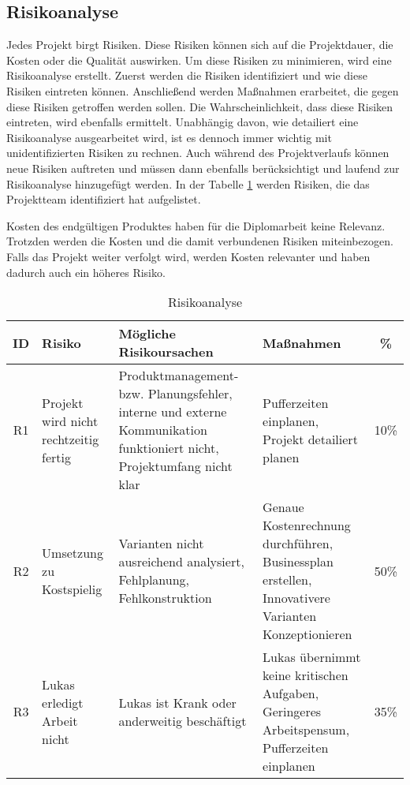 \subsection{Risikoanalyse}

Jedes Projekt birgt Risiken. Diese Risiken können sich auf die Projektdauer, die Kosten oder die Qualität auswirken. Um diese Risiken zu minimieren, wird eine Risikoanalyse erstellt. Zuerst werden die Risiken identifiziert und wie diese Risiken eintreten können. Anschließend werden Maßnahmen erarbeitet, die gegen diese Risiken getroffen werden sollen. Die Wahrscheinlichkeit, dass diese Risiken eintreten, wird ebenfalls ermittelt. Unabhängig davon, wie detailiert eine Risikoanalyse ausgearbeitet wird, ist es dennoch immer wichtig mit unidentifizierten Risiken zu rechnen. Auch während des Projektverlaufs können neue Risiken auftreten und müssen dann ebenfalls berücksichtigt und laufend zur Risikoanalyse hinzugefügt werden\cite{risikomanagement}. In der Tabelle \ref{tab:risikoanalyse} werden Risiken, die das Projektteam identifiziert hat aufgelistet.

Kosten des endgültigen Produktes haben für die Diplomarbeit keine Relevanz. Trotzden werden die Kosten und die damit verbundenen Risiken miteinbezogen. Falls das Projekt weiter verfolgt wird, werden Kosten relevanter und haben dadurch auch ein höheres Risiko.

\begin{table}[ht]
  {
    \small
    \begin{tabular}{|c|p{}|p{}|p{}|c|}
      \hline
      ID & Risiko                                & Mögliche Risikoursachen                                                                                                & Maßnahmen                                                                                         & \%   \\ \hline
      R1 & Projekt wird nicht rechtzeitig fertig & Produktmanagement- bzw. Planungsfehler, interne und externe Kommunikation funktioniert nicht, Projektumfang nicht klar & Pufferzeiten einplanen, Projekt detailiert planen                                                 & 10\% \\ \hline
      R2 & Umsetzung zu Kostspielig              & Varianten nicht ausreichend analysiert, Fehlplanung, Fehlkonstruktion                                                  & Genaue Kostenrechnung durchführen, Businessplan erstellen, Innovativere Varianten Konzeptionieren & 50\% \\ \hline
      R3 & Lukas erledigt Arbeit nicht           & Lukas ist Krank oder anderweitig beschäftigt                                                                           & Lukas übernimmt keine kritischen Aufgaben, Geringeres Arbeitspensum, Pufferzeiten einplanen       & 35\% \\ \hline
    \end{tabular}}
  \caption{Risikoanalyse}
  \label{tab:risikoanalyse}
\end{table}
